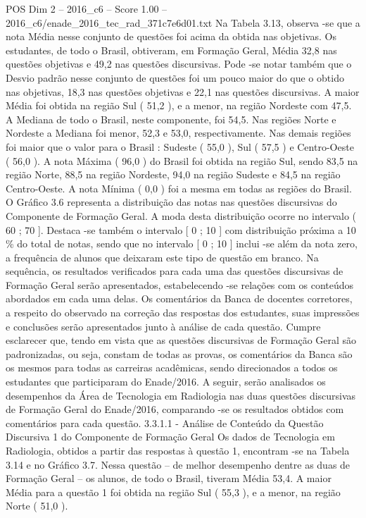 \begin{textsample}{POS Dim 2 – 2016\_c6 – Score 1.00 – 2016\_c6/enade\_2016\_tec\_rad\_371c7e6d01.txt}
Na Tabela 3.13, observa -se que a nota Média nesse conjunto de questões foi acima da obtida nas objetivas.
Os estudantes, de todo o Brasil, obtiveram, em Formação Geral, Média 32,8 nas questões objetivas e 49,2 nas questões discursivas.
Pode -se notar também que o Desvio padrão nesse conjunto de questões foi um pouco maior do que o obtido nas objetivas, 18,3 nas questões objetivas e 22,1 nas questões discursivas.
A maior Média foi obtida na região Sul ( 51,2 ), e a menor, na região Nordeste com 47,5.
A Mediana de todo o Brasil, neste componente, foi 54,5.
Nas regiões Norte e Nordeste a Mediana foi menor, 52,3 e 53,0, respectivamente.
Nas demais regiões foi maior que o valor para o Brasil : Sudeste ( 55,0 ), Sul ( 57,5 ) e Centro-Oeste ( 56,0 ).
A nota Máxima ( 96,0 ) do Brasil foi obtida na região Sul, sendo 83,5 na região Norte, 88,5 na região Nordeste, 94,0 na região Sudeste e 84,5 na região Centro-Oeste.
A nota Mínima ( 0,0 ) foi a mesma em todas as regiões do Brasil.
O Gráfico 3.6 representa a distribuição das notas nas questões discursivas do Componente de Formação Geral.
A moda desta distribuição ocorre no intervalo ( 60 ; 70 ].
Destaca -se também o intervalo [ 0 ; 10 ] com distribuição próxima a 10 \% do total de notas, sendo que no intervalo [ 0 ; 10 ] inclui -se além da nota zero, a frequência de alunos que deixaram este tipo de questão em branco.
Na sequência, os resultados verificados para cada uma das questões discursivas de Formação Geral serão apresentados, estabelecendo -se relações com os conteúdos abordados em cada uma delas.
Os comentários da Banca de docentes corretores, a respeito do observado na correção das respostas dos estudantes, suas impressões e conclusões serão apresentados junto à análise de cada questão.
Cumpre esclarecer que, tendo em vista que as questões discursivas de Formação Geral são padronizadas, ou seja, constam de todas as provas, os comentários da Banca são os mesmos para todas as carreiras acadêmicas, sendo direcionados a todos os estudantes que participaram do Enade/2016.
A seguir, serão analisados os desempenhos da Área de Tecnologia em Radiologia nas duas questões discursivas de Formação Geral do Enade/2016, comparando -se os resultados obtidos com comentários para cada questão. 3.3.1.1 - Análise de Conteúdo da Questão Discursiva 1 do Componente de Formação Geral Os dados de Tecnologia em Radiologia, obtidos a partir das respostas à questão 1, encontram -se na Tabela 3.14 e no Gráfico 3.7.
Nessa questão – de melhor desempenho dentre as duas de Formação Geral – os alunos, de todo o Brasil, tiveram Média 53,4.
A maior Média para a questão 1 foi obtida na região Sul ( 55,3 ), e a menor, na região Norte ( 51,0 ).

\end{textsample}
